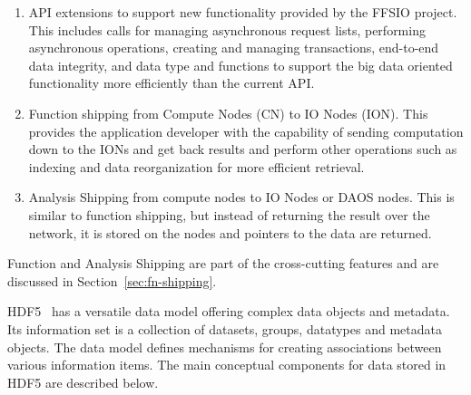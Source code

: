 \documentclass[conference]{IEEEtran} \pdfpagewidth=8.5in
\begin{document}
\begin{enumerate}
\def\labelenumi{\arabic{enumi}.}

\item
  API extensions to support new functionality provided by the FFSIO project.
  This includes calls for managing asynchronous request lists, performing
  asynchronous operations, creating and managing transactions, end-to-end data
  integrity, and data type and functions to support the big data oriented
  functionality more efficiently than the current API.

\item
  Function shipping from Compute Nodes (CN) to IO Nodes (ION). This provides
  the application developer with the capability of sending computation down to
  the IONs and get back results and perform other operations such as indexing
  and data reorganization for more efficient retrieval.

\item
  Analysis Shipping from compute nodes to IO Nodes or DAOS nodes. This is
  similar to function shipping, but instead of returning the result over the
  network, it is stored on the nodes and pointers to the data are returned.

\end{enumerate}

Function and Analysis Shipping are part of the cross-cutting features and are
discussed in Section~\ref{sec:fn-shipping}.

HDF5~\cite{folk:2011:hdf5} has a versatile data model offering complex data objects
and metadata. Its information set is a collection of datasets, groups,
datatypes and metadata objects. The data model defines mechanisms for
creating associations between various information items. The main
conceptual components for data stored in HDF5 are described below.
\end{document}
